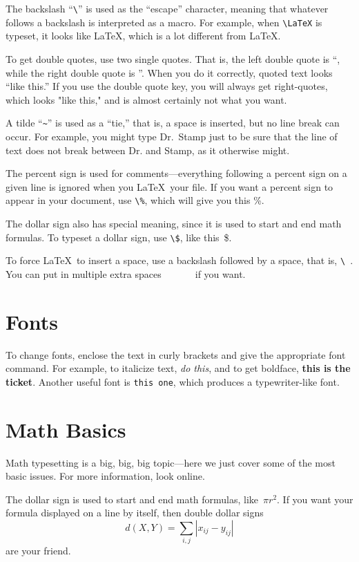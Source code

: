 The backslash ``\verb+\+'' is used 
as the ``escape'' character, meaning that
whatever follows a backslash is interpreted as a macro.
For example, when \verb+\LaTeX+ is typeset, it looks like \LaTeX, which 
is a lot different from LaTeX.

To get double quotes, use two single quotes. That is, the left double quote is ``, while the right double
quote is ''. When you do it correctly, quoted text looks ``like this.''
If you use the double quote key, you will always get right-quotes, which looks "like this," and is
almost certainly not what you want.

A tilde ``\verb+~+'' is used as a ``tie,'' that is, a space is inserted, but no line break can occur.
For example, you might type Dr.~Stamp just to be sure that the line of text
does not break between Dr. and Stamp, as it otherwise might.

The percent sign is used for comments---everything following a percent sign 
on a given line is ignored when you \LaTeX\ your file. %
If you want a percent sign to appear in your document, use \verb+\%+, 
which will give you this \%.

The dollar sign also has special meaning, since it is used to start and end
math formulas. To typeset a dollar sign, use \verb+\$+, like this~\$.

To force \LaTeX\ to insert a space, use a backslash followed by
a space, that is, \verb+\ +. You can put in multiple extra spaces\ \ \ \ \ \ \ if you want.

\section{Fonts}

To change fonts, enclose the text in curly brackets and give the appropriate font command.
For example, to italicize text, {\it do this}, and to get boldface, {\bf this is the ticket}.
Another useful font is {\tt this one}, which produces a typewriter-like font.


\section{Math Basics}

Math typesetting is a big, big, big topic---here we just cover some of
the most basic issues. For more information, look online.

The dollar sign is used to start and end math formulas, like~$\pi r^2$.
If you want your formula displayed on a line by itself, then double
dollar signs
$$
  d(X,Y) =  \sum_{i,j} |x_{ij} - y_{ij}| 
$$
are your friend.

